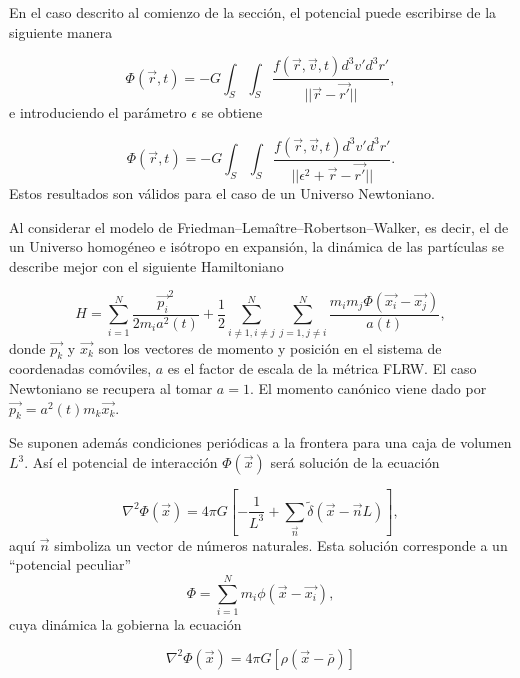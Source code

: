\documentclass[a4paper,openright,10pt, oneside, final]{book}
\begin{document}
En el caso descrito al comienzo de la sección, el potencial puede escribirse de la siguiente manera

\begin{equation}
  \Phi(\vec{r},t)
  = -G
  \int_{S}\int_{S}
  \frac{f(\vec{r}, \vec{v}, t)d^{3}v'd^{3}r'}{||\vec{r}-\vec{r'}||},\label{eqn2.8}
\end{equation}
e introduciendo el parámetro $\epsilon$ se obtiene

\begin{equation}
 \Phi(\vec{r},t)
  = -G
  \int_{S}\int_{S}
  \frac{f(\vec{r}, \vec{v}, t)d^{3}v'd^{3}r'}{||\epsilon^{2} + \vec{r}-\vec{r'}||}.\label{eqn2.9}
\end{equation}
Estos resultados son válidos para el caso de un Universo Newtoniano.

Al considerar el modelo de Friedman--Lemaître--Robertson--Walker, es decir, el de un Universo homogéneo e isótropo en expansión, la dinámica de las partículas se describe mejor con el siguiente Hamiltoniano

\begin{equation}
  H 
  = \sum_{i=1}^{N} \frac{\vec{p_{i}}^{2}}{2 m_{i} a^{2}(t)} 
  +
  \frac{1}{2} \sum_{i\not=1,i\not=j}^{N}\sum_{j=1,j\not=i}^{N}
  \frac{m_{i}m_{j}\Phi(\vec{x_{i}}-\vec{x_{j}})}{a(t)},\label{eqn2.10}
\end{equation}
donde $\vec{p_{k}}$ y $\vec{x_{k}}$ son los vectores de momento y posición en el sistema de coordenadas comóviles, $a$ es el factor de escala de la métrica FLRW. El caso Newtoniano se recupera al tomar $a = 1$. El momento canónico viene dado por $\vec{p_{k}} = a^{2}(t)m_{k}\vec{x_{k}}$.

Se suponen además condiciones periódicas a la frontera para una caja de volumen $L^{3}$. Así el potencial de interacción $\Phi(\vec{x})$ será solución de la ecuación

\begin{equation}
 \nabla^{2}\Phi(\vec{x})
 =
 4\pi G
 \left[
 -\frac{1}{L^{3}}
 +
 \sum_{\vec{n}} \tilde{\delta}(\vec{x}-\vec{n}L)
 \right],\label{eqn2.11}
\end{equation}
aquí $\vec{n}$ simboliza un vector de números naturales. Esta solución corresponde a un “potencial peculiar”
\begin{equation}
 \Phi
 =
 \sum_{i=1}^{N} m_{i} \phi(\vec{x}-\vec{x_{i}}),\label{eqn2.12}
\end{equation}
cuya dinámica la gobierna la ecuación

\begin{equation}
  \nabla^{2}\Phi(\vec{x})
  =
  4 \pi G
  [\rho(\vec{x}-\bar{\rho})]\label{eqn2.13}
\end{equation}
\end{document}
